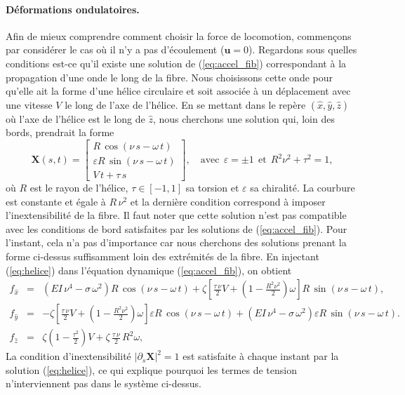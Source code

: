 \documentclass[a4paper,11pt]{article}
\begin{document}
\paragraph{Déformations ondulatoires.} Afin de mieux comprendre comment choisir la force de locomotion, commençons par considérer le cas où il n'y a pas d'écoulement ($\bm u=0$). Regardons sous quelles conditions est-ce qu'il existe une solution de (\ref{eq:accel_fib}) correspondant à la propagation d'une onde le long de la fibre.  Nous choisissons cette onde pour qu'elle ait la forme d'une hélice circulaire et soit associée à un déplacement avec une vitesse $V$ le long de l'axe de l'hélice. En se mettant dans le repère $(\hat{x},\hat{y},\hat{z})$ où l'axe de l'hélice est le long de $\hat{z}$, nous cherchons une solution qui, loin des bords, prendrait la forme
\begin{equation}
  \bm X(s,t) = \left[ \begin{array}{c} R\,\cos(\nu\,s-\omega\,t) \\ \varepsilon R\,\sin(\nu\,s-\omega\,t)\\  V\,t+\tau\,s\end{array}\right]\!,\quad\mbox{avec}\ \ \varepsilon = \pm 1 \ \ \mbox{et}\ \ R^2\nu^2+\tau^2 = 1,
  \label{eq:helice}
\end{equation}
où $R$ est le rayon de l'hélice, $\tau\in[-1,1]$ sa torsion et $\varepsilon$ sa chiralité.  La courbure est constante et égale à $R\,\nu^2$ et la dernière condition correspond à imposer  l'inextensibilité de la fibre. Il faut noter que cette solution n'est pas compatible avec les conditions de bord satisfaites par les solutions de (\ref{eq:accel_fib}). Pour l'instant, cela n'a pas d'importance car nous cherchons des solutions prenant la forme ci-dessus suffisamment loin des extrémités de la fibre. En injectant (\ref{eq:helice}) dans l'équation dynamique (\ref{eq:accel_fib}), on obtient
\begin{eqnarray}
  f_{\hat{x}} &=& \left(EI\,\nu^4-\sigma\,\omega^2\right) R\,\cos(\nu\,s-\omega\,t) + \zeta \left[\frac{\tau\,\nu}{2}V+\left(1-\frac{R^2\nu^2}{2}\right) \omega\right]R\,\sin(\nu\,s-\omega\,t), \label{eq:fxtmp}\\
  f_{\hat{y}}&=& -\zeta \left[\frac{\tau\,\nu}{2}V+\left(1-\frac{R^2\nu^2}{2}\right) \omega\right]\varepsilon R\, \cos(\nu\,s-\omega\,t)+\left(EI\,\nu^4-\sigma\,\omega^2\right) \varepsilon R\,\sin(\nu\,s-\omega\,t).\\
   f_{\hat{z}} &=& \zeta\left(1-\frac{\tau^2}{2}\right)V +\zeta\,\frac{\tau\,\nu}{2}\,R^2\omega \label{eq:fztmp},
 \end{eqnarray}
La condition d'inextensibilité $|\partial_s\bm X|^2 = 1$ est satisfaite à chaque instant par la solution  (\ref{eq:helice}), ce qui explique pourquoi les termes de tension n'interviennent pas dans le système ci-dessus.
\end{document}

